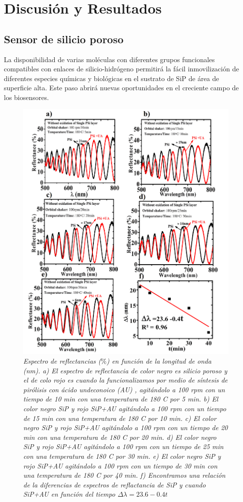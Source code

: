 \documentclass[a4paper,11pt,]{book}
\begin{document}
\section{Discusión y Resultados}

\subsection{ Sensor de  silicio poroso}
La disponibilidad de varias moléculas con diferentes grupos funcionales compatibles con enlaces de silicio-hidrógeno permitirá la fácil inmovilización de diferentes especies químicas y biológicas en el sustrato de SiP de área de superficie alta. Este paso abrirá nuevas oportunidades en el creciente campo de los biosensores.
\begin{figure}[H]
	\centering
	\includegraphics[scale=.3]{../Images/sens1}
	\caption{\emph{Espectro de reflectancias ($\%$) en función de la longitud de onda (nm). a) El espectro de reflectancia de color negro es silicio poroso y  el de colo rojo es cuando la funcionalizamos por medio de síntesis de pirólisis con ácido undeconoico (AU) , agitándolo a 100 rpm con un tiempo de 10 min con una temperatura de 180 C por 5 min. b) El color negro SiP y rojo SiP+AU agitándolo a 100 rpm con un tiempo de 15 min con una temperatura de 180 C por 10 min. c) El color negro SiP y rojo SiP+AU agitándolo a 100 rpm con un tiempo de 20 min con una temperatura de 180 C por 20 min. d) El color negro SiP y rojo SiP+AU agitándolo a 100 rpm con un tiempo de 25 min con una temperatura de 180 C por 30 min. e) El color negro SiP y rojo SiP+AU agitándolo a 100 rpm con un tiempo de 30 min con una temperatura de 180 C por 40 min. f) Encontramos una relación de la diferencias de espectros de reflactancia de SiP y cuando SiP+AU  en función del tiempo $ \Delta \lambda =23.6 -0.4t$} }
	\label{fig:REc1}
\end{figure}
\end{document}
